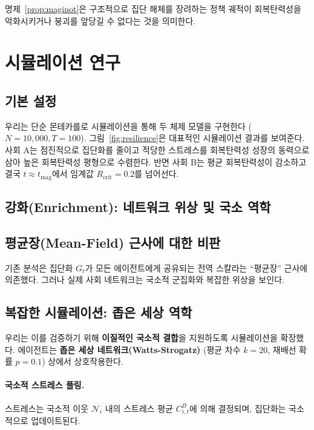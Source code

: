 \documentclass[11pt]{article}
\theoremstyle{plain}
\begin{document}
명제~\ref{prop:maginot}은 구조적으로 집단 해체를 장려하는 정책 궤적이 회복탄력성을 악화시키거나 붕괴를 앞당길 수 없다는 것을 의미한다.

\section{시뮬레이션 연구}
\label{sec:simulation}

\subsection{기본 설정}

우리는 단순 몬테카를로 시뮬레이션을 통해 두 체제 모델을 구현한다 ($N=10,000, T=100$).
그림~\ref{fig:resilience}은 대표적인 시뮬레이션 결과를 보여준다.
사회 A는 점진적으로 집단화를 줄이고 적당한 스트레스를 회복탄력성 성장의 동력으로 삼아 높은 회복탄력성 평형으로 수렴한다.
반면 사회 B는 평균 회복탄력성이 감소하고 결국 $t \approx t_{\text{mag}}$에서 임계값 $R_{\text{crit}} = 0.2$를 넘어선다.

\subsection{강화(Enrichment): 네트워크 위상 및 국소 역학}
\label{sec:enrichment}

\subsection{평균장(Mean-Field) 근사에 대한 비판}
기존 분석은 집단화 $G_t$가 모든 에이전트에게 공유되는 전역 스칼라는 ``평균장'' 근사에 의존했다.
그러나 실제 사회 네트워크는 국소적 군집화와 복잡한 위상을 보인다.

\subsection{복잡한 시뮬레이션: 좁은 세상 역학}
우리는 이를 검증하기 위해 \textbf{이질적인 국소적 결합}을 지원하도록 시뮬레이션을 확장했다.
에이전트는 \textbf{좁은 세상 네트워크(Watts-Strogatz)} (평균 차수 $k=20$, 재배선 확률 $p=0.1$) 상에서 상호작용한다.

\paragraph{국소적 스트레스 풀링.}
스트레스는 국소적 이웃 $\mathcal{N}_i$ 내의 스트레스 평균 $C_{i,t}^B$에 의해 결정되며, 집단화는 국소적으로 업데이트된다.
\end{document}
